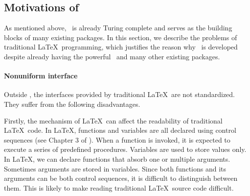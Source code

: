 \documentclass{ltugboat}
\begin{document}
\subsection{Motivations of \liii}

As mentioned above, \LaTeXe~is already Turing complete and serves as the building blocks of many existing packages. In this section, we describe the problems of traditional \LaTeX~programming, which justifies the reason why \liii~is developed despite already having the powerful \LaTeXe~and many other existing packages.

\paragraph{Nonuniform interface} 

Outside \liii, the interfaces provided by traditional \LaTeX~are not standardized. They suffer from the following disadvantages.


Firstly, the mechanism of \LaTeX~can affect the readability of traditional \LaTeX~code. 
In \LaTeX, functions and variables are all declared using control sequences (see Chapter 3 of \cite{knuth1984texbook}).
When a function is invoked, it is expected to execute a series of predefined procedures. Variables are used to store values only.
In \LaTeX, we can declare functions that absorb one or multiple arguments.
Sometimes arguments are stored in variables.
Since both functions and its arguments can be both control sequences, it is difficult to distinguish between them. 
This is likely to make reading traditional \LaTeX\ source code difficult.
\end{document}
